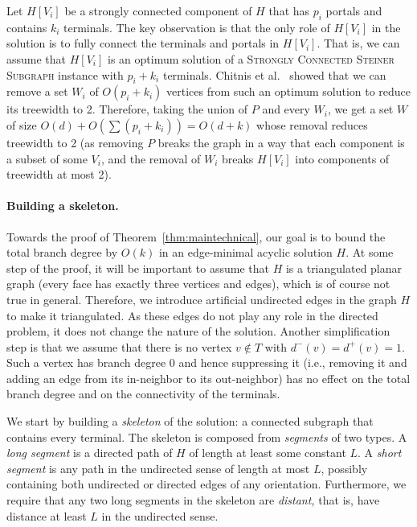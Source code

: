   Let $H[V_i]$ be a strongly connected component of $H$ that has $p_i$ portals and contains $k_i$ terminals. The key observation is that the only role of $H[V_i]$ in the solution is to fully connect the terminals and portals in $H[V_i]$. That is, we can assume that $H[V_i]$ is an optimum solution of a \textsc{Strongly Connected Steiner Subgraph} instance with $p_i+k_i$ terminals. Chitnis et al.~\cite{ChitnisFHM20} showed that we can remove a set $W_i$ of $O(p_i+k_i)$ vertices from such an optimum solution to reduce its treewidth to 2. Therefore, taking the union of $P$ and every $W_i$, we get a set $W$ of size $O(d)+O(\sum (p_i+k_i))=O(d+k)$ whose removal reduces treewidth to 2 (as removing $P$ breaks the graph in a way that each component is a subset of some $V_i$, and the removal of $W_i$ breaks $H[V_i]$ into components of treewidth at most 2).

  \paragraph{Building a skeleton.} Towards the proof of Theorem~\ref{thm:maintechnical}, our goal is to bound the total branch degree by $O(k)$ in an edge-minimal acyclic solution $H$. At some step of the proof, it will be important to assume that $H$ is a triangulated planar graph (every face has exactly three vertices and edges), which is of course not true in general. Therefore, we introduce artificial undirected edges in the graph $H$ to make it triangulated. As these edges do not play any role in the directed problem, it does not change the nature of the solution. Another simplification step is that we assume that there is no vertex $v\not\in T$ with $d^-(v)=d^+(v)=1$. Such a vertex has branch degree 0 and hence suppressing it (i.e., removing it and adding an edge from its in-neighbor to its out-neighbor) has no effect on the total branch degree and on the connectivity of the terminals.

  We start by building a \emph{skeleton} of the solution: a connected subgraph that contains every terminal. The skeleton is composed from {\em segments} of two types. A {\em long segment} is a directed path of $H$ of length at least some constant $L$. A {\em short segment} is any path in the undirected sense of length at most $L$, possibly containing both undirected or directed edges of any orientation. Furthermore, we require that any two long segments in the skeleton are {\em distant,} that is, have distance at least $L$ in the undirected sense.

